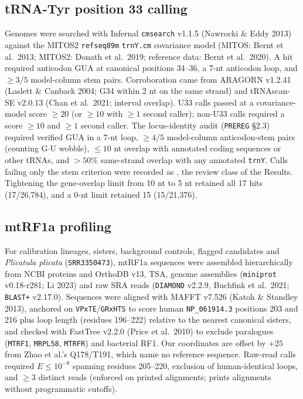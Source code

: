 \documentclass[11pt, a4paper]{article}
\begin{document}
\subsection{tRNA-Tyr position 33 calling}
Genomes were searched with Infernal \texttt{cmsearch} v1.1.5 (Nawrocki \& Eddy 2013) against the MITOS2 \texttt{refseq89m} \texttt{trnY.cm} covariance model (MITOS: Bernt et al.\ 2013; MITOS2: Donath et al.\ 2019; reference data: Bernt et al.\ 2020). A hit required anticodon GUA at canonical positions 34--36, a 7-nt anticodon loop, and $\ge 3/5$ model-column stem pairs. Corroboration came from ARAGORN v1.2.41 (Laslett \& Canback 2004; G34 within 2 nt on the same strand) and tRNAscan-SE v2.0.13 (Chan et al.\ 2021; interval overlap). U33 calls passed at a covariance-model score $\ge 20$ (or $\ge 10$ with $\ge 1$ second caller); non-U33 calls required a score $\ge 10$ and $\ge 1$ second caller. The locus-identity audit (\texttt{PREREG} \S 2.3) required verified GUA in a 7-nt loop, $\ge 4/5$ model-column anticodon-stem pairs (counting G$\cdot$U wobble), $\le 10$ nt overlap with annotated coding sequences or other tRNAs, and $>50\%$ same-strand overlap with any annotated \texttt{trnY}. Calls failing only the stem criterion were recorded as , the review class of the Results. Tightening the gene-overlap limit from 10 nt to 5 nt retained all 17 hits (17/26,784), and a 0-nt limit retained 15 (15/21,376).

\subsection{mtRF1a profiling}
For calibration lineages, sisters, background controls, flagged candidates and \textit{Plicatula plicata} (\texttt{SRR3350473}), mtRF1a sequences were assembled hierarchically from NCBI proteins and OrthoDB v13, TSA, genome assemblies (\texttt{miniprot} v0.18-r281; Li 2023) and raw SRA reads (\texttt{DIAMOND} v2.2.9, Buchfink et al.\ 2021; \texttt{BLAST+} v2.17.0). Sequences were aligned with MAFFT v7.526 (Katoh \& Standley 2013), anchored on \texttt{VPxTE}/\texttt{GRxHTS} to score human \texttt{NP\_061914.3} positions 203 and 216 plus loop length (residues 196--222) relative to the nearest canonical sisters, and checked with FastTree v2.2.0 (Price et al.\ 2010) to exclude paralogues (\texttt{MTRF1}, \texttt{MRPL58}, \texttt{MTRFR}) and bacterial RF1. Our coordinates are offset by $+25$ from Zhao et al.'s Q178/T191, which name no reference sequence. Raw-read calls required $E \le 10^{-8}$ spanning residues 205--220, exclusion of human-identical loops, and $\ge 3$ distinct reads (enforced on printed alignments;  prints alignments without programmatic cutoffs).
\end{document}
